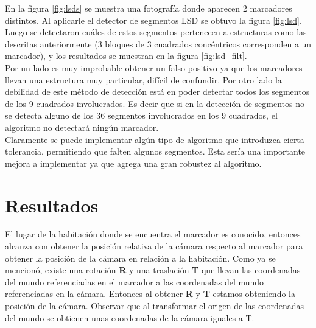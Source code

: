 En la figura \ref{fig:lsds} se muestra una fotografía donde aparecen 2 marcadores distintos. Al aplicarle el detector de segmentos LSD se obtuvo la figura \ref{fig:lsd}. Luego se detectaron cuáles de estos segmentos pertenecen a estructuras como las descritas anteriormente (3 bloques de 3 cuadrados concéntricos corresponden a un marcador), y los resultados se muestran en la figura \ref{fig:lsd_filt}.\\

Por un lado es muy improbable obtener un falso positivo ya que los marcadores llevan una estructura muy particular, difícil de confundir. Por otro lado la debilidad de este método de detección está en poder detectar todos los segmentos de los 9 cuadrados involucrados. Es decir que si en la detección de segmentos no se detecta alguno de los 36 segmentos involucrados en los 9 cuadrados, el algoritmo no detectará ningún marcador.\\

Claramente se puede implementar algún tipo de algoritmo que introduzca cierta tolerancia, permitiendo que falten algunos segmentos. Esta sería una importante mejora a implementar ya que agrega una gran robustez al algoritmo.

\section{Resultados}

El lugar de la habitación donde se encuentra el marcador es conocido, entonces alcanza con obtener la posición relativa de la cámara respecto al marcador para obtener la posición de la cámara en relación a la habitación. Como ya se mencionó, existe una rotación \textbf{R} y una traslación \textbf{T} que llevan las coordenadas del mundo referenciadas en el marcador a las coordenadas del mundo referenciadas en la cámara. Entonces al obtener \textbf{R} y \textbf{T} estamos obteniendo la posición de la cámara. Observar que al transformar el origen de las coordenadas del mundo se obtienen unas coordenadas de la cámara iguales a T.\\

